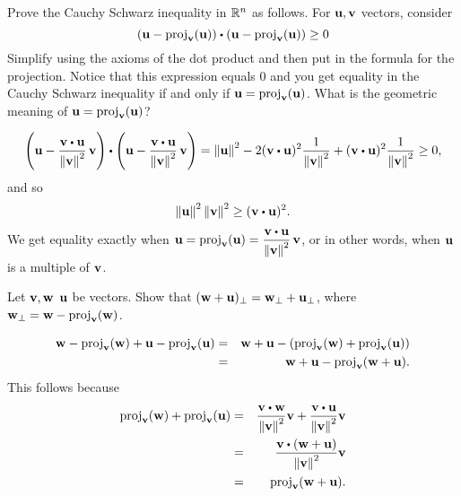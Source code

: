 \begin{ex}
  Prove the Cauchy Schwarz inequality in $\mathbb{R}^{n}$ as follows.  For
  $\vect{u},\vect{v}$ vectors, consider
  \begin{equation*}
    (\vect{u}-
    \proj_{\vect{v}}(\vect{u})) \dotprod (\vect{u}-
    \proj_{\vect{v}}(\vect{u})) \geq 0
  \end{equation*}
  Simplify using the axioms of the dot product and then put in the
  formula for the projection. Notice that this expression equals $0$
  and you get equality in the Cauchy Schwarz inequality if and only if
  $\vect{u}=\proj_{\vect{v}}(\vect{u})$. What is the geometric
  meaning of $\vect{u}=\proj_{\vect{v}}(\vect{u})$?
  \begin{sol}
    \begin{equation*}
      \paren{\vect{u}-\frac{\vect{v}\dotprod\vect{u}}{\norm{\vect{v}}^{2}}\,\vect{v}}
      \dotprod
      \paren{\vect{u}-\frac{\vect{v}\dotprod\vect{u}}{\norm{\vect{v}}^{2}}\,\vect{v}} 
      = \norm{\vect{u}}^{2} - 2(\vect{v}\dotprod \vect{u})^{2}\frac{1}{\norm{\vect{v}}^{2}}+(\vect{v}\dotprod \vect{u})^{2}\frac{1}{ \norm{\vect{v}}^{2}}
      \geq 0,
    \end{equation*}
    and so
    \begin{equation*}
      \norm{\vect{u}} ^{2}\norm{\vect{v}}
      ^{2}\geq (\vect{v}\dotprod \vect{u}) ^{2}.
    \end{equation*}
    We get equality exactly when
    $\displaystyle\vect{u}=\proj_{\vect{v}}(\vect{u}) =
    \frac{\vect{v}\dotprod \vect{u}}{\norm{\vect{v}} ^{2}}\,\vect{v}$,
    or in other words, when $\vect{u}$ is a multiple of $\vect{v}$.
  \end{sol}
\end{ex}

\begin{ex}\label{perp-linear}
  Let $\vect{v},\vect{w}$ $\vect{u}$ be vectors. Show that
  $(\vect{w}+\vect{u})_{\perp}=\vect{w}_{\perp}+\vect{u}_{\perp}$,
  where $\vect{w}_{\perp}=\vect{w}-\proj_{\vect{v}}(\vect{w})$.
  \begin{sol}
    \begin{eqnarray*}
      \vect{w}-\proj_{\vect{v}}(\vect{w})+\vect{u}-\proj_{\vect{v}}(\vect{u})
      &=& \vect{w}+\vect{u}-(\proj_{\vect{v}}(\vect{w})+\proj_{\vect{v}}(\vect{u})) \\
      &=&\vect{w}+\vect{u}-\proj_{\vect{v}}(\vect{w}+\vect{u}).
    \end{eqnarray*}
    This follows because
    \begin{eqnarray*}
      \proj_{\vect{v}}(\vect{w})+\proj_{\vect{v}}(\vect{u})
      &=& \frac{\vect{v}\dotprod\vect{w}}{\norm{\vect{v}}^{2}}\vect{v}
          + \frac{\vect{v}\dotprod\vect{u}}{\norm{\vect{v}}^{2}}\vect{v} \\
      &=& \frac{\vect{v}\dotprod(\vect{w}+\vect{u})}{\norm{\vect{v}}^{2}}\vect{v} \\
      &=& \proj_{\vect{v}}(\vect{w}+\vect{u}).
    \end{eqnarray*}
  \end{sol}
\end{ex}

